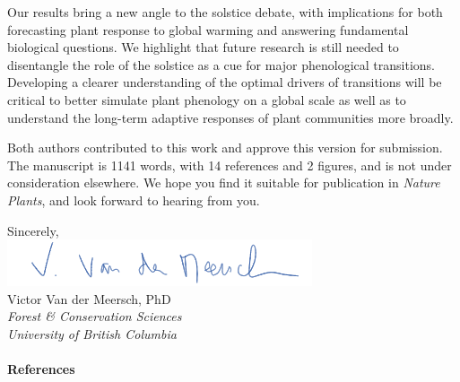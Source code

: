 \documentclass[11pt,a4paper]{article}
\begin{document}
\vspace{0.25cm}

\noindent Our results bring a new angle to the solstice debate, with implications for both forecasting plant response to global warming and answering fundamental biological questions. We highlight that future research is still needed to disentangle the role of the solstice as a cue for major phenological transitions. Developing a clearer understanding of the optimal drivers of transitions will be critical to better simulate plant phenology on a global scale as well as to understand the long-term adaptive responses of plant communities more broadly. 

\vspace{0.25cm}

\noindent Both authors contributed to this work and approve this version for submission. The manuscript is 1141 words, with 14 references and 2 figures, and is not under consideration elsewhere. We hope you find it suitable for publication in \emph{Nature Plants}, and look forward to hearing from you. 

\vspace{0.45cm}
\noindent Sincerely, 
\vspace{0.35cm}\\
\hspace*{-0.5cm}
\includegraphics[scale=.65]{sign_long.png} \\
\noindent Victor Van der Meersch, PhD\\
\noindent \emph{Forest \& Conservation Sciences}\\
\noindent \emph{University of British Columbia}

\clearpage

\paragraph{References}
\printbibliography[heading=none]


\newpage
\end{document}
